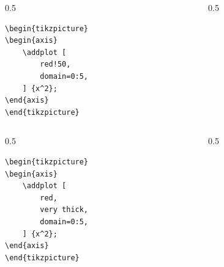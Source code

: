 \documentclass[12pt,aspectratio=169,ignorenonframetext]{ltxbeamer}
\begin{document}
\begin{frame}[fragile]
\begin{columns}
    \begin{column}{0.5\textwidth}
        \begin{verbatim}
\begin{tikzpicture}
\begin{axis}
    \addplot [
        red!50,
        domain=0:5,
    ] {x^2};
\end{axis}
\end{tikzpicture}
        \end{verbatim}
    \end{column}
    {\color{gray} \vline}
    \begin{column}{0.5\textwidth}
    \end{column}
\end{columns}
\end{frame}





\begin{frame}[fragile]
\begin{columns}
    \begin{column}{0.5\textwidth}
        \begin{verbatim}
\begin{tikzpicture}
\begin{axis}
    \addplot [
        red,
        very thick,
        domain=0:5,
    ] {x^2};
\end{axis}
\end{tikzpicture}
        \end{verbatim}
    \end{column}
    {\color{gray} \vline}
    \begin{column}{0.5\textwidth}
    \end{column}
\end{columns}
\end{frame}
\end{document}
